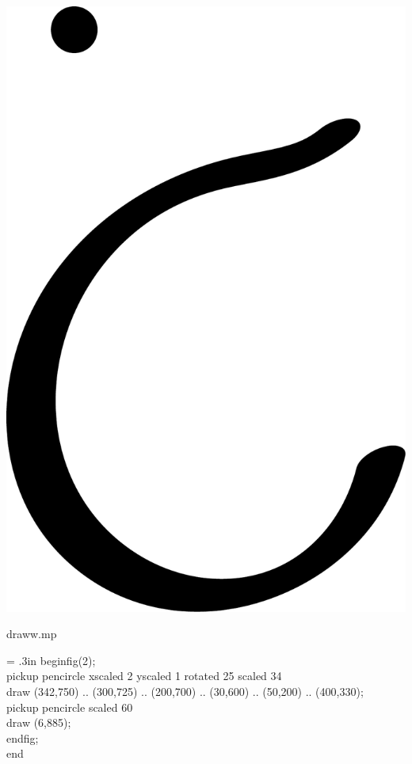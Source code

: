 \documentclass[danish,a2paper,22pt]{scrartcl}
\begin{document}
\begin{multicols*}{3}
\begin{spacing}{0.5}
\center
\includegraphics[scale=.25]{draww-2.pdf}
\vspace{-1cm}

\flushleft
\color{White}
\romansmall
draww.mp\\
\vspace{.4cm}
\color{Black}
\typewritersmall
{\leftskip = .3in
beginfig(2);\\
pickup pencircle xscaled 2 yscaled 1 rotated 25 scaled 34\\
draw (342,750) .. (300,725) .. (200,700) .. (30,600) .. (50,200) .. (400,330);\\
pickup pencircle scaled 60\\
draw (6,885);\\
endfig;\\
end
\par}


\end{spacing}
\end{multicols*}
\end{document}
